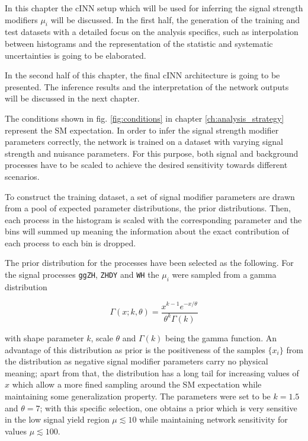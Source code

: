 \label{ch:network_setup}

In this chapter the cINN setup which will be used for inferring the signal strength modifiers $\mu_i$ will be discussed. In the first half, the generation of the training and test datasets with a detailed focus on the analysis specifics, such as interpolation between histograms and the representation of the statistic and systematic uncertainties is going to be elaborated.

In the second half of this chapter, the final cINN architecture is going to be presented. The inference results and the interpretation of the network outputs will be discussed in the next chapter.


The conditions shown in fig. \ref{fig:conditions} in chapter \ref{ch:analysis_strategy} represent the SM expectation. In order to infer the signal strength modifier parameters correctly, the network is trained on a dataset with varying signal strength and nuisance parameters. For this purpose, both signal and background processes have to be scaled to achieve the desired sensitivity towards different scenarios.


To construct the training dataset, a set of signal modifier parameters are drawn from a pool of expected parameter distributions, the prior distributions. Then, each process in the histogram is scaled with the corresponding parameter and the bins will summed up meaning the information about the exact contribution of each process to each bin is dropped.

The prior distribution for the processes have been selected as the following. For the signal processes \texttt{ggZH}, \texttt{ZHDY} and \texttt{WH} the $\mu_i$ were sampled from a gamma distribution

\begin{equation*}
	\Gamma(x; k, \theta) = \frac{x^{k-1}e^{-x/\theta}}{\theta^k\Gamma(k)}
\end{equation*}

with shape parameter $k$, scale $\theta$ and $\Gamma(k)$ being the gamma function. An advantage of this distribution as prior is the positiveness of the samples $\{x_i\}$ from the distribution as negative signal modifier parameters carry no physical meaning; apart from that, the distribution has a long tail for increasing values of $x$ which allow a more fined sampling around the SM expectation while maintaining some generalization property. The parameters were set to be $k = 1.5$ and $\theta = 7$; with this specific selection, one obtains a prior which is very sensitive in the low signal yield region $\mu \lesssim 10$ while maintaining network sensitivity for values $\mu\lesssim100$.

